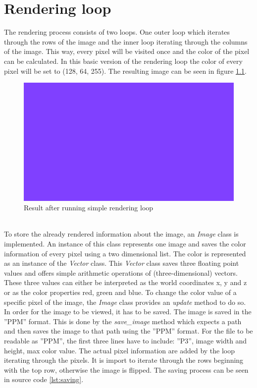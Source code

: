 \documentclass[12pt]{report}
\begin{document}
\chapter{Rendering loop}
The rendering process consists of two loops. One outer loop which iterates through the rows of the image and the inner loop iterating through the columns of the image. This way, every pixel will be visited once and the color of the pixel can be calculated. In this basic version of the rendering loop the color of every pixel will be set to (128, 64, 255). The resulting image can be seen in figure \ref{fig:step1}.
\begin{figure}[h!]
\includegraphics[width=\textwidth]{step1}
\centering
\caption{Result after running simple rendering loop}
\label{fig:step1}
\end{figure} \\
To store the already rendered information about the image, an \textit{Image} class is implemented. An instance of this class represents one image and saves the color information of every pixel using a two dimensional list. The color is represented as an instance of the \textit{Vector} class. This \textit{Vector} class saves three floating point values and offers simple arithmetic operations of (three-dimensional) vectors. These three values can either be interpreted as the world coordinates x, y and z or as the color properties red, green and blue. To change the color value of a specific pixel of the image, the \textit{Image} class provides an \textit{update} method to do so. In order for the image to be viewed, it has to be saved. The image is saved in the ''PPM'' format. This is done by the \textit{save\_image} method which expects a path and then saves the image to that path using the ''PPM'' format. For the file to be readable as ''PPM'', the first three lines have to include: ''P3'', image width and height, max color value. The actual pixel information are added by the loop iterating through the pixels. It is import to iterate through the rows beginning with the top row, otherwise the image is flipped. The saving process can be seen in source code \ref{lst:saving}.
\end{document}
